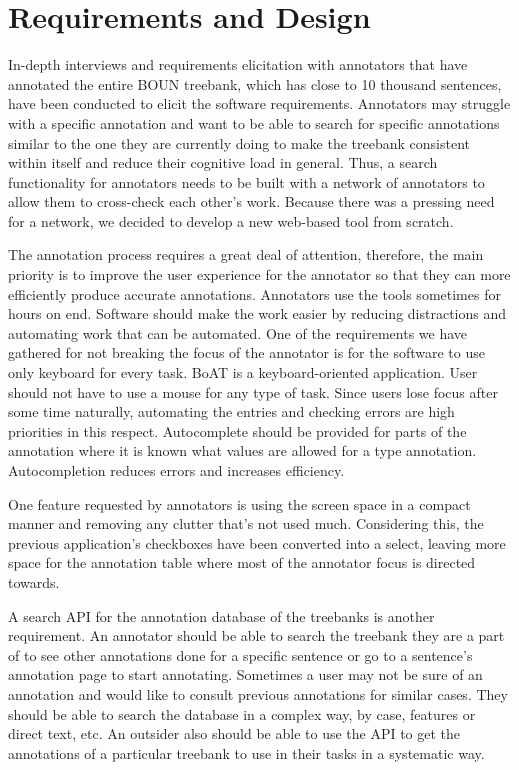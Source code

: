 \section{Requirements and Design}
\label{sec:requirements}

In-depth interviews and requirements elicitation with annotators that have annotated the entire BOUN treebank, which has close to 10 thousand sentences, have been conducted to elicit the software requirements.
Annotators may struggle with a specific annotation and want to be able to search for specific annotations similar to the one they are currently doing to make the treebank consistent within itself and reduce their cognitive load in general.
Thus, a search functionality for annotators needs to be built with a network of annotators to allow them to cross-check each other's work.
Because there was a pressing need for a network, we decided to develop a new web-based tool from scratch.

The annotation process requires a great deal of attention, therefore, the main priority is to improve the user experience for the annotator so that they can more efficiently produce accurate annotations.
Annotators use the tools sometimes for hours on end.
Software should make the work easier by reducing distractions and automating work that can be automated.
One of the requirements we have gathered for not breaking the focus of the annotator is for the software to use only keyboard for every task.
BoAT is a keyboard-oriented application.
User should not have to use a mouse for any type of task.
Since users lose focus after some time naturally, automating the entries and checking errors are high priorities in this respect.
Autocomplete should be provided for parts of the annotation where it is known what values are allowed for a \conllu{} type annotation.
Autocompletion reduces errors and increases efficiency.

One feature requested by annotators is using the screen space in a compact manner and removing any clutter that's not used much.
Considering this, the previous application's checkboxes have been converted into a select, leaving more space for the annotation table where most of the annotator focus is directed towards.

A search API for the annotation database of the treebanks is another requirement.
An annotator should be able to search the treebank they are a part of to see other annotations done for a specific sentence or go to a sentence's annotation page to start annotating.
Sometimes a user may not be sure of an annotation and would like to consult previous annotations for similar cases.
They should be able to search the database in a complex way, by case, features or direct text, etc.
An outsider also should be able to use the API to get the annotations of a particular treebank to use in their tasks in a systematic way.
